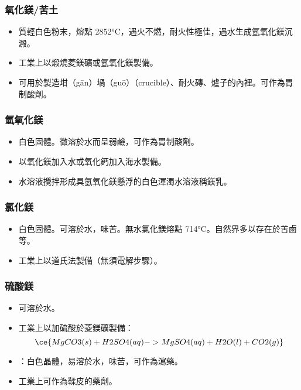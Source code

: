 \documentclass[a4paper,12pt]{report}
\begin{document}
\begin{itemize}
\begin{itemize}
\subsubsection{氧化鎂/苦土}
\begin{itemize}
\item 質輕白色粉末，熔點 2852°C，遇火不燃，耐火性極佳，遇水生成氫氧化鎂沉澱。
\item 工業上以煅燒菱鎂礦或氫氧化鎂製備。
\item 可用於製造坩（gān）堝（guō）（crucible）、耐火磚、爐子的內裡。可作為胃制酸劑。
\end{itemize}
\subsubsection{氫氧化鎂}
\begin{itemize}
\item 白色固體。微溶於水而呈弱鹼，可作為胃制酸劑。
\item 以氧化鎂加入水或氧化鈣加入海水製備。
\item 水溶液攪拌形成具氫氧化鎂懸浮的白色渾濁水溶液稱鎂乳。
\end{itemize}
\subsubsection{氯化鎂}
\begin{itemize}
\item 白色固體。可溶於水，味苦。無水氯化鎂熔點 714°C。自然界多以存在於苦鹵等。
\item 工業上以道氏法製備（無須電解步驟）。
\end{itemize}
\subsubsection{硫酸鎂}
\begin{itemize}
\item 可溶於水。
\item 工業上以加硫酸於菱鎂礦製備：
\[\ce{MgCO3(s) + H2SO4(aq) -> MgSO4(aq) + H2O(l) + CO2(g)}\]
\item {}：白色晶體，易溶於水，味苦，可作為瀉藥。
\item 工業上可作為鞣皮的藥劑。
\end{itemize}

\end{itemize}
\end{itemize}
\end{document}
